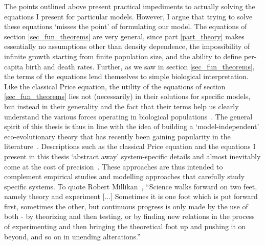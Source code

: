 The points outlined above present practical impediments to actually solving the equations I present for particular models. However, I argue that trying to solve these equations `misses the point' of formulating our model. The equations of section \ref{sec_fun_theorems} are very general, since part \ref{part_theory} makes essentially no assumptions other than density dependence, the impossibility of infinite growth starting from finite population size, and the ability to define per-capita birth and death rates. Further, as we saw in section \ref{sec_fun_theorems}, the terms of the equations lend themselves to simple biological interpretation. Like the classical Price equation, the utility of the equations of section \ref{sec_fun_theorems} lies not (necessarily) in their solutions for specific models, but instead in their generality and the fact that their terms help us clearly understand the various forces operating in biological populations~\citep{frank_natural_2012,luque_one_2017, luque_mirror_2021}. The general spirit of this thesis is thus in line with the idea of building a `model-independent' eco-evolutionary theory that has recently been gaining popularity in the literature~\citep{grafen_formal_2014, queller_fundamental_2017, lion_theoretical_2018, allen_mathematical_2019, rice_universal_2020, week_white_2021, wickman_theoretical_2022, kuosmanen_turnover_2022, mazzolini_universality_2022,lion_extending_2023,allen_natural_2023}. Descriptions such as the classical Price equation and the equations I present in this thesis `abstract away' system-specific details and almost inevitably come at the cost of precision~\citep{levins_strategy_1966, potochnik_idealization_2018}. These approaches are thus intended to complement empirical studies and modelling approaches that carefully study specific systems. To quote Robert Millikan~\citep{millikan_electron_1924}, ``Science walks forward on two feet, namely theory and experiment [...] Sometimes it is one foot which is put forward first, sometimes the other, but continuous progress is only made by the use of both - by theorizing and then testing, or by finding new relations in the process of experimenting and then bringing the theoretical foot up and pushing it on beyond, and so on in unending alterations.''
